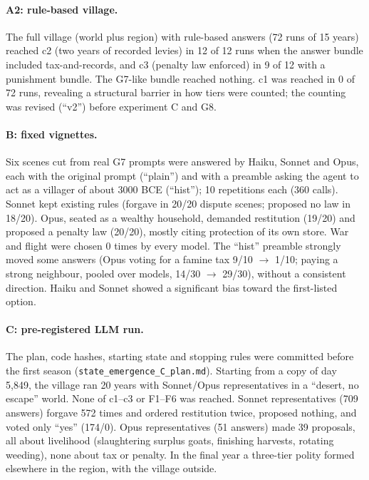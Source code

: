 \documentclass[11pt]{article}
\begin{document}
\paragraph{A2: rule-based village.} The full village (world plus region) with rule-based answers (72 runs of 15 years) reached c2 (two years of recorded levies) in 12 of 12 runs when the answer bundle included tax-and-records, and c3 (penalty law enforced) in 9 of 12 with a punishment bundle. The G7-like bundle reached nothing. c1 was reached in 0 of 72 runs, revealing a structural barrier in how tiers were counted; the counting was revised (``v2'') before experiment C and G8.

\paragraph{B: fixed vignettes.} Six scenes cut from real G7 prompts were answered by Haiku, Sonnet and Opus, each with the original prompt (``plain'') and with a preamble asking the agent to act as a villager of about 3000 BCE (``hist''); 10 repetitions each (360 calls). Sonnet kept existing rules (forgave in 20/20 dispute scenes; proposed no law in 18/20). Opus, seated as a wealthy household, demanded restitution (19/20) and proposed a penalty law (20/20), mostly citing protection of its own store. War and flight were chosen 0 times by every model. The ``hist'' preamble strongly moved some answers (Opus voting for a famine tax 9/10 $\rightarrow$ 1/10; paying a strong neighbour, pooled over models, 14/30 $\rightarrow$ 29/30), without a consistent direction. Haiku and Sonnet showed a significant bias toward the first-listed option.

\paragraph{C: pre-registered LLM run.} The plan, code hashes, starting state and stopping rules were committed before the first season (\texttt{state\_emergence\_C\_plan.md}). Starting from a copy of day 5{,}849, the village ran 20 years with Sonnet/Opus representatives in a ``desert, no escape'' world. None of c1--c3 or F1--F6 was reached. Sonnet representatives (709 answers) forgave 572 times and ordered restitution twice, proposed nothing, and voted only ``yes'' (174/0). Opus representatives (51 answers) made 39 proposals, all about livelihood (slaughtering surplus goats, finishing harvests, rotating weeding), none about tax or penalty. In the final year a three-tier polity formed elsewhere in the region, with the village outside.
\end{document}
